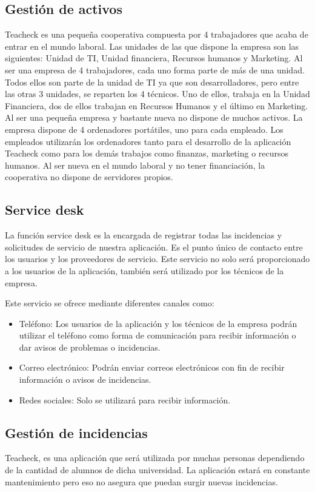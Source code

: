 \subsection{Gestión de activos}
Teacheck es una pequeña cooperativa compuesta por 4 trabajadores que
acaba de entrar en el mundo laboral. Las unidades de las que dispone
la empresa son las siguientes: Unidad de TI, Unidad financiera,
Recursos humanos y Marketing. Al ser una empresa de 4 trabajadores,
cada uno forma parte de más de una unidad. Todos ellos son parte de la
unidad de TI ya que son desarrolladores, pero entre las otras 3
unidades, se reparten los 4 técnicos. Uno de ellos, trabaja en la
Unidad Financiera, dos de ellos trabajan en Recursos Humanos y el
último en Marketing.
 Al ser una pequeña empresa y bastante nueva no dispone de
muchos activos.  La empresa dispone de 4 ordenadores portátiles, uno
para cada empleado. Los empleados utilizarán los ordenadores tanto
para el desarrollo de la aplicación Teacheck como para los demás
trabajos como finanzas, marketing o recursos humanos. Al ser nueva en
el mundo laboral y no tener financiación, la cooperativa no dispone de
servidores propios.
\subsection{Service desk}
La función service desk es la encargada de registrar todas las
incidencias y solicitudes de servicio de nuestra aplicación. Es el
punto único de contacto entre los usuarios y los proveedores de
servicio. Este servicio no solo será proporcionado a los usuarios de
la aplicación, también será utilizado por los técnicos de la empresa.

Este servicio se ofrece mediante diferentes canales como:
\begin{itemize}
\item{Teléfono: }Los usuarios de la aplicación y los técnicos de la
  empresa podrán utilizar el teléfono como forma de comunicación para
  recibir información o dar avisos de problemas o incidencias.
\item{Correo electrónico: }Podrán enviar correos electrónicos con fin
  de recibir información o avisos de incidencias.
\item{Redes sociales: }Solo se utilizará para recibir información.
\end{itemize}
\subsection{Gestión de incidencias}
Teacheck, es una aplicación que será utilizada por muchas personas
dependiendo de la cantidad de alumnos de dicha universidad. La
aplicación estará en constante mantenimiento pero eso no asegura que
puedan surgir nuevas incidencias.


